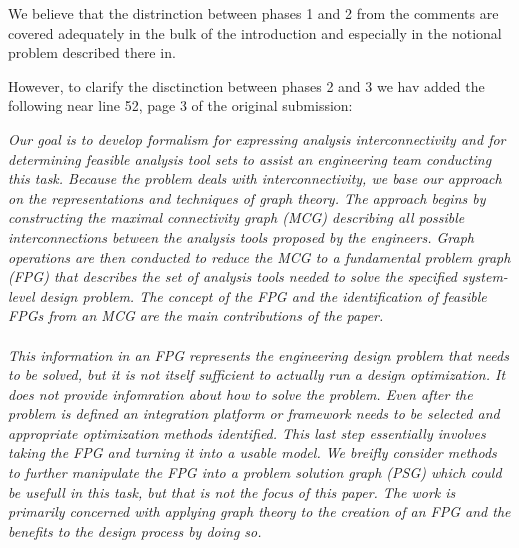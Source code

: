 \documentclass{aiaa-tc}
\begin{document}
We believe that the distrinction between phases 1 and 2 from the comments are covered adequately 
in the bulk of the introduction and especially in the notional problem described there in. 

However, to clarify the disctinction between phases 2 and 3 we hav added the following near 
line 52, page 3 of the original submission: 

\emph{%
Our goal is to develop formalism for expressing analysis interconnectivity and for determining feasible
    analysis tool sets to assist an engineering team conducting this task. Because the problem deals with
    interconnectivity, we base our approach on the representations and techniques of graph theory.
    The approach begins by constructing the \emph{maximal connectivity graph (MCG)} describing all possible
    interconnections between the analysis tools proposed by the engineers. Graph operations are then
    conducted to reduce the MCG to a \emph{fundamental problem graph (FPG)} that describes the set of analysis
    tools needed to solve the specified system-level design problem. The concept of the FPG and 
    the identification of feasible FPGs from an MCG are the main contributions of the paper. \\\\
    This information in an FPG represents the engineering design problem that needs to be solved, but it is not 
    itself sufficient to actually run a design optimization. It does not provide infomration 
    about how to solve the problem. Even after the problem is defined an integration platform or framework needs 
    to be selected and appropriate optimization methods identified. This last step essentially 
    involves taking the FPG and turning it into a usable model. We breifly consider methods to further 
    manipulate the FPG into a \emph{problem solution graph (PSG)} which could be usefull in this 
    task, but that is not the focus of this paper. The work is primarily concerned with applying graph 
    theory to the creation of an FPG and the benefits to the design process by doing so.}
\end{document}

